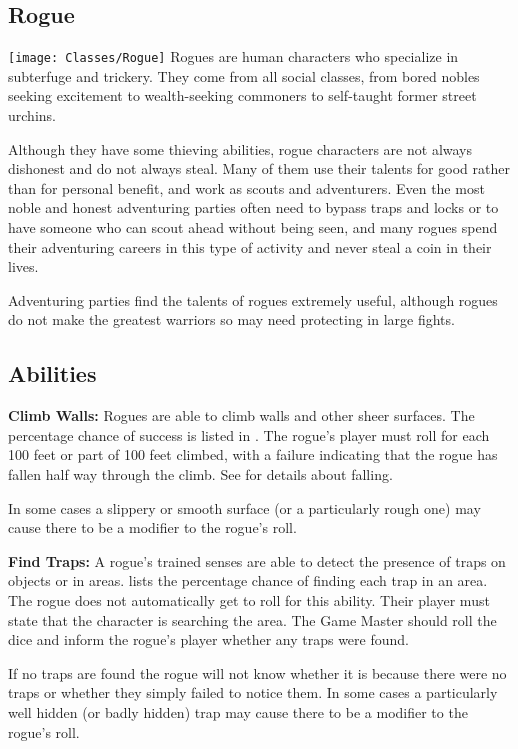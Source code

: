 \begin{multicols*}{2}
\section{Rogue}\label{class:Rogue}
\texttt{[image: Classes/Rogue]}
Rogues are human characters who specialize in subterfuge and trickery. They come from all social classes, from bored nobles seeking excitement to wealth-seeking commoners to self-taught former street urchins.

Although they have some thieving abilities, rogue characters are not always dishonest and do not always steal. Many of them use their talents for good rather than for personal benefit, and work as scouts and adventurers. Even the most noble and honest adventuring parties often need to bypass traps and locks or to have someone who can scout ahead without being seen, and many rogues spend their adventuring careers in this type of activity and never steal a coin in their lives.

Adventuring parties find the talents of rogues extremely useful, although rogues do not make the greatest warriors so may need protecting in large fights.

\subsection{Abilities}
\textbf{Climb Walls:} Rogues are able to climb walls and other sheer surfaces. The percentage chance of success is listed in . The rogue’s player must roll for each 100 feet or part of 100 feet climbed, with a failure indicating that the rogue has fallen half way through the climb. See  for details about falling.

In some cases a slippery or smooth surface (or a particularly rough one) may cause there to be a modifier to the rogue’s roll.

\textbf{Find Traps:}\label{sec:Find Traps} A rogue’s trained senses are able to detect the presence of traps on objects or in areas. lists the percentage chance of finding each trap in an area. The rogue does not automatically get to roll for this ability. Their player must state that the character is searching the area. The Game Master should roll the dice and inform the rogue’s player whether any traps were found.

If no traps are found the rogue will not know whether it is because there were no traps or whether they simply failed to notice them. In some cases a particularly well hidden (or badly hidden) trap may cause there to be a modifier to the rogue’s roll.


\end{multicols*}
